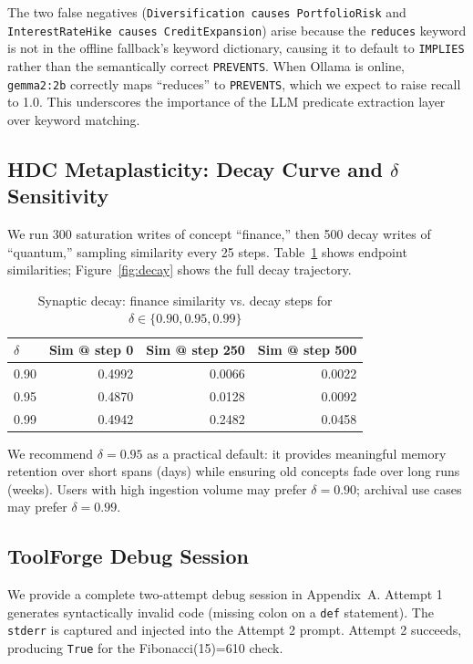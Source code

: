 \documentclass[sigconf]{acmart}
\begin{document}
The two false negatives (\texttt{Diversification causes PortfolioRisk} and \texttt{InterestRateHike causes CreditExpansion}) arise because the \texttt{reduces} keyword is not in the offline fallback's keyword dictionary, causing it to default to \texttt{IMPLIES} rather than the semantically correct \texttt{PREVENTS}. When Ollama is online, \texttt{gemma2:2b} correctly maps ``reduces'' to \texttt{PREVENTS}, which we expect to raise recall to 1.0. This underscores the importance of the LLM predicate extraction layer over keyword matching.

\subsection{HDC Metaplasticity: Decay Curve and $\delta$ Sensitivity}

We run 300 saturation writes of concept ``finance,'' then 500 decay writes of ``quantum,'' sampling similarity every 25 steps. Table~\ref{tab:decay} shows endpoint similarities; Figure~\ref{fig:decay} shows the full decay trajectory.

\begin{table}[h]
\caption{Synaptic decay: finance similarity vs. decay steps for $\delta \in \{0.90, 0.95, 0.99\}$}
\begin{tabular}{lrrr}
\toprule
$\delta$ & Sim @ step 0 & Sim @ step 250 & Sim @ step 500 \\
\midrule
0.90 & 0.4992 & 0.0066 & 0.0022 \\
0.95 & 0.4870 & 0.0128 & 0.0092 \\
0.99 & 0.4942 & 0.2482 & 0.0458 \\
\bottomrule
\end{tabular}
\label{tab:decay}
\end{table}

We recommend $\delta = 0.95$ as a practical default: it provides meaningful memory retention over short spans (days) while ensuring old concepts fade over long runs (weeks). Users with high ingestion volume may prefer $\delta = 0.90$; archival use cases may prefer $\delta = 0.99$.

\subsection{ToolForge Debug Session}

We provide a complete two-attempt debug session in Appendix~A. Attempt 1 generates syntactically invalid code (missing colon on a \texttt{def} statement). The \texttt{stderr} is captured and injected into the Attempt 2 prompt. Attempt 2 succeeds, producing \texttt{True} for the Fibonacci(15)=610 check.
\end{document}

